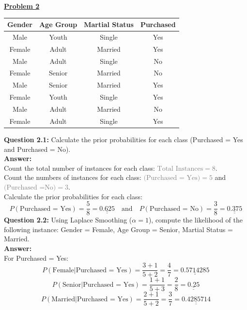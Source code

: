 \documentclass{book}
\begin{document}
\underline{\textbf{Problem 2}}\\
\begin{center}
    \begin{tabular}{|c|c|c|c|}
        \hline
        \rowcolor{lightblue}
        \textbf{Gender} & \textbf{Age Group} & \textbf{Martial Status} & \textbf{Purchased} \\
        \hline
        Male & Youth & Single & Yes \\
        \hline
        Female & Adult & Married & Yes \\
        \hline
        Male & Adult & Single & No \\
        \hline
        Female & Senior & Married & No \\
        \hline
        Male & Senior & Married & Yes \\
        \hline
        Female & Youth & Single & Yes \\
        \hline
        Male & Adult & Married & No \\
        \hline
        Female & Adult & Single & Yes \\
        \hline
    \end{tabular}
\end{center}
\textbf{Question 2.1:} Calculate the prior probabilities for each class (Purchased = Yes and Purchased = No).\\
\textbf{Answer:}\\
Count the total number of instances for each class: \textcolor{gray}{\(\text{Total Instances} = 8\)}.\\
Count the numbers of instances for each class: \textcolor{gray}{\(\text{(Purchased = Yes)} = 5\)} and \textcolor{gray}{\(\text{(Purchased =No)} = 3\)}.\\
Calculate the prior probabilities for each class:
\[
    P(\text{Purchased = Yes}) = \frac{5}{8} = \underline{\underline{0.625}} \quad \text{and} \quad P(\text{Purchased = No}) = \frac{3}{8} = \underline{\underline{0.375}}
\]
\textbf{Question 2.2:} Using Laplace Smoothing (\(\alpha = 1\)), compute the likelihood of the following instance: Gender = Female, Age Group = Senior,  Martial Status = Married.\\
\textbf{Answer:}\\
For Purchased = Yes:
\[
    P(\text{Female}|\text{Purchased = Yes}) = \frac{3 + 1}{5 + 2} = \frac{4}{7} = \underline{\underline{0.5714285}}
\]
\[
    P(\text{Senior}|\text{Purchased = Yes}) = \frac{1 + 1}{5 + 3} = \frac{2}{8} = \underline{\underline{0.25}}
\]
\[
    P(\text{Married}|\text{Purchased = Yes}) = \frac{2 + 1}{5 + 2} = \frac{3}{7} = \underline{\underline{0.4285714}}
\]
\end{document}
